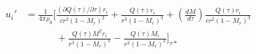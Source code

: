 






\begin{equation}
    \begin{split}
    u_i' 
    &= \frac{1}{4\pi\rho_0} \Bigg[ \frac{(\partial Q(\tau)/\partial \tau)r_i}{c r^2(1 - M_r)^2} 
    + \frac{Q(\tau)r_i}{r^3(1-M_r)^3}
    + \left(\frac{dM}{d\tau} \right) \frac{Q(\tau)r_i}{cr^2(1-M_r)^3} \\
    &\phantom{= \frac{1}{4\pi\rho_0}
    \Bigg[} + \frac{Q(\tau)M^2r_i}{r^3(1-M_r)^3}
    - \frac{Q(\tau)M_i}{r^2(1-M_r)^2}
    \Bigg]_{\tau*}
    \end{split}
    \label{eq:monopole_velocity}
\end{equation}